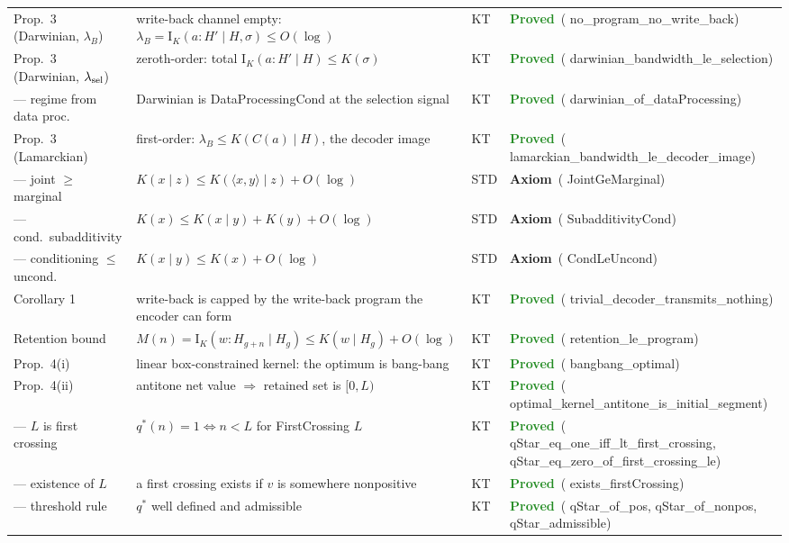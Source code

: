 \documentclass[11pt,a4paper]{article}
\newcommand{\lean}[1]{{\ttfamily\small
  \let\leanunderscore\_\def\_{\leanunderscore\allowbreak}#1}}
\newcommand{\Ik}{\mathrm{I}_K}
\newcommand{\stproved}{\textcolor{ForestGreen}{\textbf{Proved}}}
\newcommand{\staxiom}{\textcolor{bcomblue}{\textbf{Axiom}}}
\begin{document}
{\begin{longtable}{@{}p{2.1cm}p{6.6cm}p{1.0cm}p{2.6cm}@{}}
Prop.\ 3 (Darwinian, $\lambda_B$) & write-back channel empty: $\lambda_B=\Ik(a:H'\!\mid\! H,\sigma)\le O(\log)$ & KT &
  \stproved\ (\lean{no\_program\_no\_write\_back}) \\
Prop.\ 3 (Darwinian, $\lambda_{\rm sel}$) & zeroth-order: total $\Ik(a:H'\!\mid\! H) \le K(\sigma)$ & KT &
  \stproved\ (\lean{darwinian\_bandwidth\_le\_selection}) \\
--- regime from data proc.\ & \lean{Darwinian} is \lean{DataProcessingCond} at the selection signal & KT &
  \stproved\ (\lean{darwinian\_of\_dataProcessing}) \\
Prop.\ 3 (Lamarckian) & first-order: $\lambda_B \le K(C(a)\!\mid\! H)$, the decoder image & KT &
  \stproved\ (\lean{lamarckian\_bandwidth\_le\_decoder\_image}) \\
--- joint $\ge$ marginal & $K(x\!\mid\! z)\le K(\langle x,y\rangle\!\mid\! z)+O(\log)$ & STD &
  \staxiom\ (\lean{JointGeMarginal}) \\
--- cond.\ subadditivity & $K(x)\le K(x\!\mid\! y)+K(y)+O(\log)$ & STD &
  \staxiom\ (\lean{SubadditivityCond}) \\
--- conditioning $\le$ uncond.\ & $K(x\!\mid\! y)\le K(x)+O(\log)$ & STD &
  \staxiom\ (\lean{CondLeUncond}) \\
Corollary 1 & write-back is capped by the write-back program the encoder can form & KT &
  \stproved\ (\lean{trivial\_decoder\_transmits\_nothing}) \\
Retention bound & $M(n)=\Ik(w:H_{g+n}\!\mid\! H_g)\le K(w\!\mid\! H_g)+O(\log)$ & KT &
  \stproved\ (\lean{retention\_le\_program}) \\
Prop.\ 4(i) & linear box-constrained kernel: the optimum is bang-bang & KT &
  \stproved\ (\lean{bangbang\_optimal}) \\
Prop.\ 4(ii) & antitone net value $\Rightarrow$ retained set is $[0,L)$ & KT &
  \stproved\ (\lean{optimal\_kernel\_antitone\_is\_initial\_segment}) \\
--- $L$ is first crossing & $q^\ast(n)=1 \iff n<L$ for \lean{FirstCrossing} $L$ & KT &
  \stproved\ (\lean{qStar\_eq\_one\_iff\_lt\_first\_crossing}, \lean{qStar\_eq\_zero\_of\_first\_crossing\_le}) \\
--- existence of $L$ & a first crossing exists if $v$ is somewhere nonpositive & KT &
  \stproved\ (\lean{exists\_firstCrossing}) \\
--- threshold rule & $q^\ast$ well defined and admissible & KT &
  \stproved\ (\lean{qStar\_of\_pos}, \lean{qStar\_of\_nonpos}, \lean{qStar\_admissible}) \\

\end{longtable}}
\end{document}
